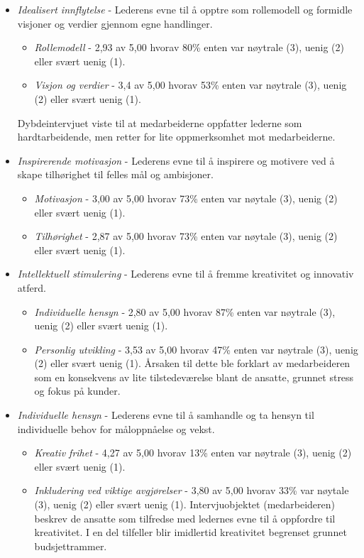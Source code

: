 \begin{itemize}
\item\textit{Idealisert innflytelse} -  Lederens evne til å opptre som rollemodell og formidle visjoner og verdier gjennom egne handlinger.
\begin{itemize}
\item\textit{Rollemodell} - 2,93 av 5,00 hvorav 80\% enten var nøytrale (3), uenig (2) eller svært uenig (1).
\item\textit{Visjon og verdier} -  3,4 av 5,00 hvorav 53\% enten var nøytrale (3), uenig (2) eller svært uenig (1).
\end{itemize}
Dybdeintervjuet viste til at medarbeiderne oppfatter lederne som hardtarbeidende, men retter for lite oppmerksomhet mot medarbeiderne.

\item\textit{Inspirerende motivasjon} - Lederens evne til å inspirere og motivere ved å skape tilhørighet til felles mål og ambisjoner.
\begin{itemize}
\item\textit{Motivasjon} - 3,00 av 5,00 hvorav 73\% enten var nøytale (3), uenig (2) eller svært uenig (1).
\item\textit{Tilhørighet} - 2,87 av 5,00 hvorav 73\% enten var nøytale (3), uenig (2) eller svært uenig (1). 
\end{itemize}

\item\textit{Intellektuell stimulering} - Lederens evne til å fremme kreativitet og innovativ atferd.
\begin{itemize}
\item\textit{Individuelle hensyn} - 2,80 av 5,00 hvorav 87\% enten var nøytrale (3), uenig (2) eller svært uenig (1).
\item\textit{Personlig utvikling} - 3,53 av 5,00 hvorav 47\% enten var nøytrale (3), uenig (2) eller svært uenig (1). 
Årsaken til dette ble forklart av medarbeideren som en konsekvens av lite tilstedeværelse blant de ansatte, grunnet stress og fokus på kunder.
\end{itemize}

\item\textit{Individuelle hensyn} - Lederens evne til å samhandle og ta hensyn til individuelle behov for måloppnåelse og vekst.
\begin{itemize}
\item\textit{Kreativ frihet} - 4,27 av 5,00 hvorav 13\% enten var nøytrale (3), uenig (2) eller svært uenig (1). 
\item\textit{Inkludering ved viktige avgjørelser} - 3,80 av 5,00 hvorav 33\% var nøytale (3), uenig (2) eller svært uenig (1).
Intervjuobjektet (medarbeideren) beskrev de ansatte som tilfredse med ledernes evne til å oppfordre til kreativitet. I en del tilfeller blir imidlertid kreativitet begrenset grunnet budsjettrammer.
\end{itemize}
\end{itemize}

